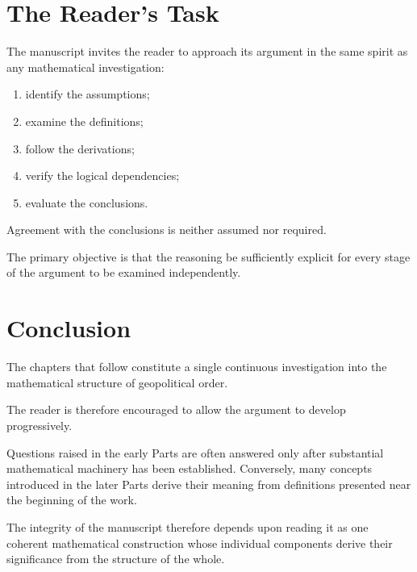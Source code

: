 \documentclass[11pt,openany]{book}
\theoremstyle{plain}
\theoremstyle{definition}
\begin{document}

\section*{The Reader's Task}

The manuscript invites the reader to approach its argument in the same spirit as any mathematical investigation:

\begin{enumerate}

\item identify the assumptions;

\item examine the definitions;

\item follow the derivations;

\item verify the logical dependencies;

\item evaluate the conclusions.

\end{enumerate}

Agreement with the conclusions is neither assumed nor required.

The primary objective is that the reasoning be sufficiently explicit for every stage of the argument to be examined independently.


\section*{Conclusion}

The chapters that follow constitute a single continuous investigation into the mathematical structure of geopolitical order.

The reader is therefore encouraged to allow the argument to develop progressively.

Questions raised in the early Parts are often answered only after substantial mathematical machinery has been established. Conversely, many concepts introduced in the later Parts derive their meaning from definitions presented near the beginning of the work.

The integrity of the manuscript therefore depends upon reading it as one coherent mathematical construction whose individual components derive their significance from the structure of the whole.
\end{document}

